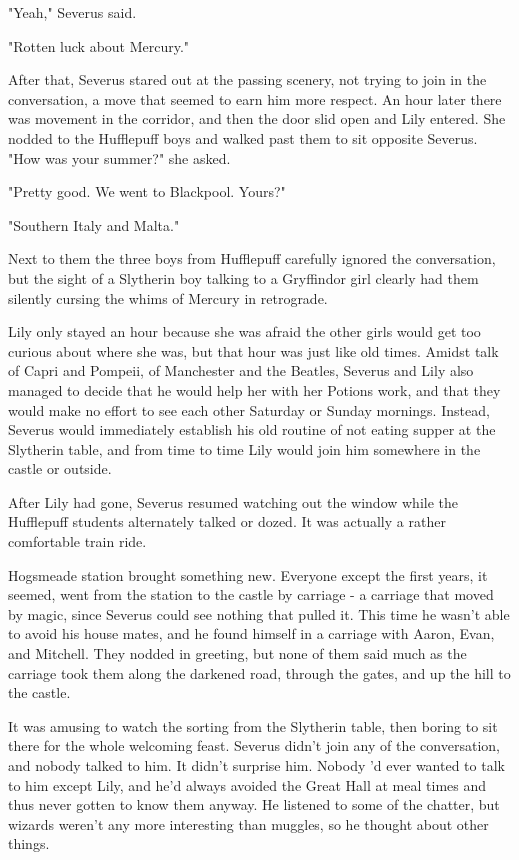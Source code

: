 "Yeah," Severus said.

"Rotten luck about Mercury."

After that, Severus stared out at the passing scenery, not trying to join in the conversation, a move that seemed to earn him more respect. An hour later there was movement in the corridor, and then the door slid open and Lily entered. She nodded to the Hufflepuff boys and walked past them to sit opposite Severus. "How was your summer?" she asked.

"Pretty good. We went to Blackpool. Yours?"

"Southern Italy and Malta."

Next to them the three boys from Hufflepuff carefully ignored the conversation, but the sight of a Slytherin boy talking to a Gryffindor girl clearly had them silently cursing the whims of Mercury in retrograde.

Lily only stayed an hour because she was afraid the other girls would get too curious about where she was, but that hour was just like old times. Amidst talk of Capri and Pompeii, of Manchester and the Beatles, Severus and Lily also managed to decide that he would help her with her Potions work, and that they would make no effort to see each other Saturday or Sunday mornings. Instead, Severus would immediately establish his old routine of not eating supper at the Slytherin table, and from time to time Lily would join him somewhere in the castle or outside.

After Lily had gone, Severus resumed watching out the window while the Hufflepuff students alternately talked or dozed. It was actually a rather comfortable train ride.

Hogsmeade station brought something new. Everyone except the first years, it seemed, went from the station to the castle by carriage - a carriage that moved by magic, since Severus could see nothing that pulled it. This time he wasn't able to avoid his house mates, and he found himself in a carriage with Aaron, Evan, and Mitchell. They nodded in greeting, but none of them said much as the carriage took them along the darkened road, through the gates, and up the hill to the castle.

It was amusing to watch the sorting from the Slytherin table, then boring to sit there for the whole welcoming feast. Severus didn't join any of the conversation, and nobody talked to him. It didn't surprise him. Nobody 'd ever wanted to talk to him except Lily, and he'd always avoided the Great Hall at meal times and thus never gotten to know them anyway. He listened to some of the chatter, but wizards weren't any more interesting than muggles, so he thought about other things.

